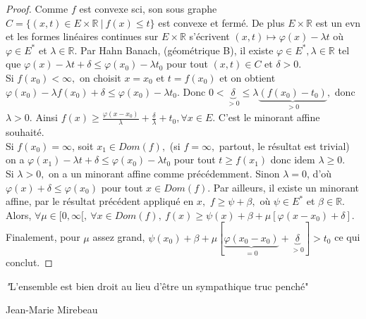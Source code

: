 \begin{proof}
    Comme $f$ est convexe sci, son sous graphe $C=\{(x,t)\in E\times \mathbb{R} \ |\ f(x)\le t\} $ est convexe et fermé. De plus $E\times \mathbb{R} $ est un evn et les formes linéaires continues sur $E\times \mathbb{R} $ s'écrivent $(x,t)\mapsto \varphi (x)-\lambda t$ où $\varphi \in E^*$ et $\lambda\in \mathbb{R} .$ Par Hahn Banach, (géométrique B), il existe $\varphi \in E^*, \lambda\in \mathbb{R} $ tel que $\varphi (x)-\lambda t+\delta\le \varphi (x_0)-\lambda t_0$ pour tout $(x,t)\in C$ et $\delta>0.$ \\
    Si $f(x_0)<\infty ,$ on choisit $x=x_0$ et $t=f(x_0)$ et on obtient $\varphi (x_0)-\lambda f(x_0)+\delta\le \varphi (x_0)-\lambda t_0.$ Donc $0<\underbrace{\delta}_{>0}\le \lambda\underbrace{(f(x_0)-t_0)}_{>0},$ donc $\lambda>0.$ Ainsi $f(x)\ge \frac{\varphi (x-x_0)}{\lambda}+\frac{\delta}{\lambda}+t_0,\forall x\in E. $ C'est le minorant affine souhaité.\\
    Si $f(x_0)=\infty $, soit $x_1\in Dom(f),$ (si $f=\infty ,$ partout, le résultat est trivial) on a $\varphi (x_1)-\lambda t+\delta\le \varphi (x_0)-\lambda t_0$ pour tout $t\ge f(x_1)$ donc idem $\lambda\ge 0.$ \\
    Si $\lambda>0,$ on a un minorant affine comme précédemment. Sinon $\lambda=0$, d'où $\varphi (x)+\delta\le \varphi (x_0)$ pour tout $x\in Dom(f)$. Par ailleurs, il existe un minorant affine, par le résultat précédent appliqué en $x,$ $f\ge \psi+\beta,$ où $\psi\in E^*$ et $\beta\in \mathbb{R} .$ \\
    Alors, $\forall \mu\in [0,\infty [,\ \forall x\in Dom(f),\ f(x)\ge \psi(x)+\beta+\mu\left[ \varphi (x-x_0)+\delta \right] .$ Finalement, pour $\mu$ assez grand, $\psi(x_0)+\beta+\mu\left[ \underbrace{\varphi (x_0-x_0)}_{=0}+\underbrace{\delta}_{>0} \right] >t_0$ ce qui conclut.
\end{proof}

\epigraph{\textit "L'ensemble est bien droit au lieu d'être un sympathique truc penché"}{Jean-Marie Mirebeau}


